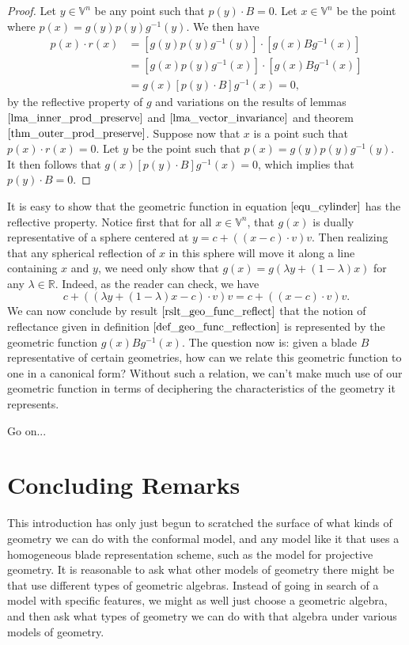 \documentclass[12pt]{article}
\newcommand{\V}{\mathbb{V}}
\newcommand{\R}{\mathbb{R}}
\begin{document}
\begin{proof}
Let $y\in\V^n$ be any point such that $p(y)\cdot B=0$.  Let $x\in\V^n$
be the point where $p(x)=g(y)p(y)g^{-1}(y)$.  We then have
\begin{align*}
p(x)\cdot r(x) &= [g(y)p(y)g^{-1}(y)]\cdot [g(x)Bg^{-1}(x)] \\
 &= [g(x)p(y)g^{-1}(x)]\cdot[g(x)Bg^{-1}(x)] \\
 &= g(x)[p(y)\cdot B]g^{-1}(x) = 0,
\end{align*}
by the reflective property of $g$ and variations on the
results of lemmas $\eqref{lma_inner_prod_preserve}$ and
$\eqref{lma_vector_invariance}$ and theorem $\eqref{thm_outer_prod_preserve}$.
Suppose now that $x$ is a point such that $p(x)\cdot r(x)=0$.
Let $y$ be the point such that $p(x)=g(y)p(y)g^{-1}(y)$.
It then follows that $g(x)[p(y)\cdot B]g^{-1}(x)=0$, which
implies that $p(y)\cdot B=0$.
\end{proof}

It is easy to show that the geometric function in equation $\eqref{equ_cylinder}$ has
the reflective property.  Notice first that for all $x\in\V^n$, that $g(x)$ is dually
representative of a sphere centered at $y=c+((x-c)\cdot v)v$.  Then realizing that any spherical
reflection of $x$ in this sphere will move it along a line containing $x$ and $y$,
we need only show that $g(x)=g(\lambda y+(1-\lambda )x)$ for any $\lambda\in\R$.
Indeed, as the reader can check, we have
\begin{equation*}
c+((\lambda y+(1-\lambda)x-c)\cdot v)v = c+((x-c)\cdot v)v.
\end{equation*}
We can now conclude by result $\eqref{rslt_geo_func_reflect}$ that the notion of reflectance given in
definition $\eqref{def_geo_func_reflection}$ is represented
by the geometric function $g(x)Bg^{-1}(x)$.  The question now is: given a
blade $B$ representative of certain geometries, how can we relate this
geometric function to one in a canonical form?  Without such a relation,
we can't make much use of our geometric function in terms of deciphering
the characteristics of the geometry it represents.

Go on...

\section{Concluding Remarks}

This introduction has only just begun to scratched the surface of
what kinds of geometry we can do with the conformal model, and
any model like it that uses a homogeneous blade representation scheme,
such as the model for projective geometry.  It is reasonable to ask
what other models of geometry there might be that use different
types of geometric algebras.  Instead of going in search of a model
with specific features, we might as well just choose a geometric algebra,
and then ask what types of geometry we can do with that algebra under
various models of geometry.
\end{document}
